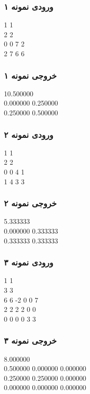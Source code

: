 \subsubsection*{ورودی نمونه ۱}
\LTR
\begin{latin}
\begin{examplebox}
    1 1 \\
    2 2 \\
    0 0 7 2 \\
    2 7 6 6
\end{examplebox}
\end{latin}
\RTL
\subsubsection*{خروجی نمونه ۱}
\LTR
\begin{latin}
\begin{examplebox}
    10.500000 \\
    0.000000 0.250000 \\
    0.250000 0.500000
\end{examplebox}
\end{latin}
\RTL
\subsubsection*{ورودی نمونه ۲}
\LTR
\begin{latin}
\begin{examplebox}
    1 1 \\
    2 2 \\
    0 0 4 1 \\
    1 4 3 3
\end{examplebox}
\end{latin}
\RTL
\subsubsection*{خروجی نمونه ۲}
\LTR
\begin{latin}
\begin{examplebox}
    5.333333 \\
    0.000000 0.333333 \\
    0.333333 0.333333
\end{examplebox}
\end{latin}
\RTL
\subsubsection*{ورودی نمونه ۳}
\LTR
\begin{latin}
\begin{examplebox}
    1 1 \\
    3 3 \\
    6 6 -2 0 0 7 \\
    2 2 2 2 0 0 \\
    0 0 0 0 3 3
\end{examplebox}
\end{latin}
\RTL
\subsubsection*{خروجی نمونه ۳}
\LTR
\begin{latin}
\begin{examplebox}
    8.000000 \\
    0.500000 0.000000 0.000000 \\
    0.250000 0.250000 0.000000 \\
    0.000000 0.000000 0.000000
\end{examplebox}
\end{latin}
\RTL